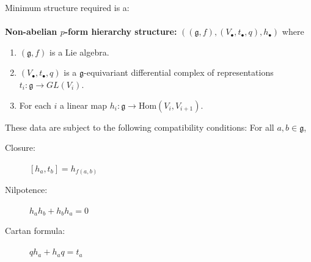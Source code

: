 \documentclass[8pt]{beamer}
\def\mypause{
} %
\begin{document}
{Minimum structure required is a:\\ 
~\\
{\bf Non-abelian $p$-form hierarchy structure:}
$((\mathfrak g, f), (V_\bullet, t_\bullet, q),  h_\bullet)$ where
\begin{enumerate}
%
\mypause 
%
\item $(\mathfrak g, f)$ is a Lie algebra.
%
\mypause 
%
\item $(V_\bullet,t_\bullet, q)$ is a $\mathfrak g$-equivariant differential complex of representations $t_i : \mathfrak g\to GL(V_i)$.
%
\mypause 
%
\item For each $i$ a linear map $h_i: \mathfrak g \to \mathrm{Hom} (V_i,V_{i+1})$. 
\end{enumerate}
These data are subject to the following compatibility conditions: For all $a,b \in \mathfrak g$,
\begin{description}
%
\mypause 
%
\item[Closure:] $[h_a , t_b] = h_{f(a,b)}$
%
\mypause 
%
\item[Nilpotence:] $h_a h_b + h_b h_a = 0$
%
\mypause 
%
\item[Cartan formula:] $q h_a + h_a q = t_a$
\end{description}

}
\end{document}
